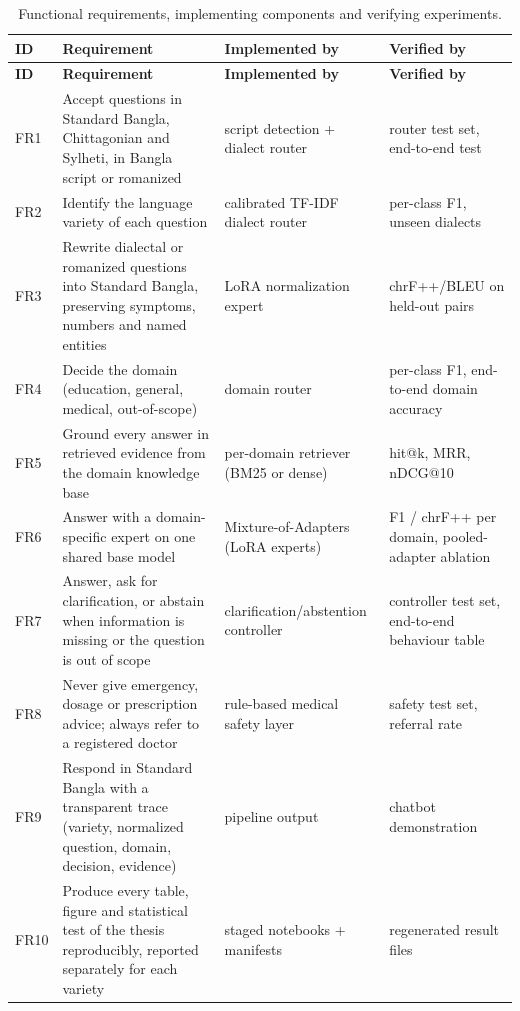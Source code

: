 \begin{longtable}{@{}p{}p{}p{}p{}@{}}
\caption{Functional requirements, implementing components and verifying experiments.}\label{tab:functional-requirements}\\
\toprule
\textbf{ID} & \textbf{Requirement} & \textbf{Implemented by} & \textbf{Verified by} \\
\midrule
\endfirsthead
\toprule
\textbf{ID} & \textbf{Requirement} & \textbf{Implemented by} & \textbf{Verified by} \\
\midrule
\endhead
\bottomrule
\endfoot
FR1 & Accept questions in Standard Bangla, Chittagonian and Sylheti, in Bangla script or romanized & script detection + dialect router & router test set, end-to-end test \\
FR2 & Identify the language variety of each question & calibrated TF-IDF dialect router & per-class F1, unseen dialects \\
FR3 & Rewrite dialectal or romanized questions into Standard Bangla, preserving symptoms, numbers and named entities & LoRA normalization expert & chrF++/BLEU on held-out pairs \\
FR4 & Decide the domain (education, general, medical, out-of-scope) & domain router & per-class F1, end-to-end domain accuracy \\
FR5 & Ground every answer in retrieved evidence from the domain knowledge base & per-domain retriever (BM25 or dense) & hit@k, MRR, nDCG@10 \\
FR6 & Answer with a domain-specific expert on one shared base model & Mixture-of-Adapters (LoRA experts) & F1 / chrF++ per domain, pooled-adapter ablation \\
FR7 & Answer, ask for clarification, or abstain when information is missing or the question is out of scope & clarification/\allowbreak{}abstention controller & controller test set, end-to-end behaviour table \\
FR8 & Never give emergency, dosage or prescription advice; always refer to a registered doctor & rule-based medical safety layer & safety test set, referral rate \\
FR9 & Respond in Standard Bangla with a transparent trace (variety, normalized question, domain, decision, evidence) & pipeline output & chatbot demonstration \\
FR10 & Produce every table, figure and statistical test of the thesis reproducibly, reported separately for each variety & staged notebooks + manifests & regenerated result files \\
\bottomrule
\end{longtable}

